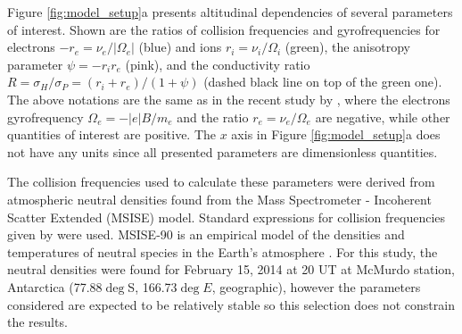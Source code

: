Figure \ref{fig:model_setup}a presents altitudinal dependencies of several parameters of interest. Shown are the ratios of collision frequencies and gyrofrequencies for electrons \(-r_e=\nu_e/|\Omega_e|\) (blue) and ions \(r_i=\nu_i/\Omega_i\) (green), the anisotropy parameter \(\psi=-r_i r_e\) (pink), and the conductivity ratio \(R=\sigma_H/\sigma_P = \left(r_i+r_e\right)/\left(1+\psi\right)\) (dashed black line on top of the green one). The above notations are the same as in the recent study by \citet{Makarevich2014c}, where the electrons gyrofrequency \(\Omega_e=-|e|B/m_e\) and the ratio \(r_e=\nu_e/\Omega_e\) are negative, while other quantities of interest are positive. The \(x\) axis in Figure \ref{fig:model_setup}a does not have any units since all presented parameters are dimensionless quantities.

The collision frequencies used to calculate these parameters were derived from atmospheric neutral densities found from the Mass Spectrometer - Incoherent Scatter Extended (MSISE) model.  Standard expressions for collision frequencies given by \citet{Schunk1978} were used. MSISE-90 is an empirical model of the densities and temperatures of neutral species in the Earth's atmosphere \citep{Hedin1991}.  For this study, the neutral densities were found for February 15, 2014 at 20 UT at McMurdo station, Antarctica (77.88\(\deg\)S, 166.73\(\deg\)\(E\), geographic), however the parameters considered are expected to be relatively stable so this selection does not constrain the results.   


